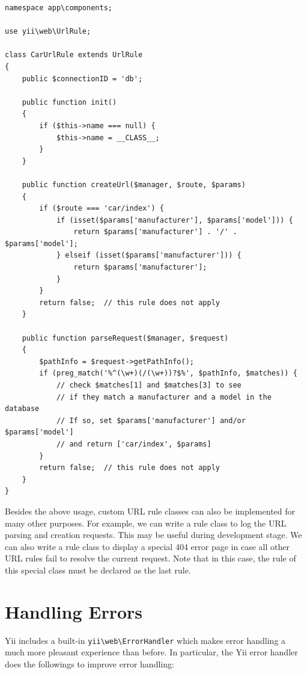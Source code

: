 \lstset{language=php}\begin{lstlisting}
namespace app\components;

use yii\web\UrlRule;

class CarUrlRule extends UrlRule
{
    public $connectionID = 'db';

    public function init()
    {
        if ($this->name === null) {
            $this->name = __CLASS__;
        }
    }

    public function createUrl($manager, $route, $params)
    {
        if ($route === 'car/index') {
            if (isset($params['manufacturer'], $params['model'])) {
                return $params['manufacturer'] . '/' . $params['model'];
            } elseif (isset($params['manufacturer'])) {
                return $params['manufacturer'];
            }
        }
        return false;  // this rule does not apply
    }

    public function parseRequest($manager, $request)
    {
        $pathInfo = $request->getPathInfo();
        if (preg_match('%^(\w+)(/(\w+))?$%', $pathInfo, $matches)) {
            // check $matches[1] and $matches[3] to see
            // if they match a manufacturer and a model in the database
            // If so, set $params['manufacturer'] and/or $params['model']
            // and return ['car/index', $params]
        }
        return false;  // this rule does not apply
    }
}
\end{lstlisting}
Besides the above usage, custom URL rule classes can also be implemented
for many other purposes. For example, we can write a rule class to log the URL parsing
and creation requests. This may be useful during development stage. We can also
write a rule class to display a special 404 error page in case all other URL rules fail
to resolve the current request. Note that in this case, the rule of this special class
must be declared as the last rule.



\label{runtime-handling-errors.md}\section{Handling Errors}
Yii includes a built-in \texttt{yii{\allowbreak{}\textbackslash}web{\allowbreak{}\textbackslash}ErrorHandler} which makes error handling a much more pleasant
experience than before. In particular, the Yii error handler does the followings to improve error handling:

